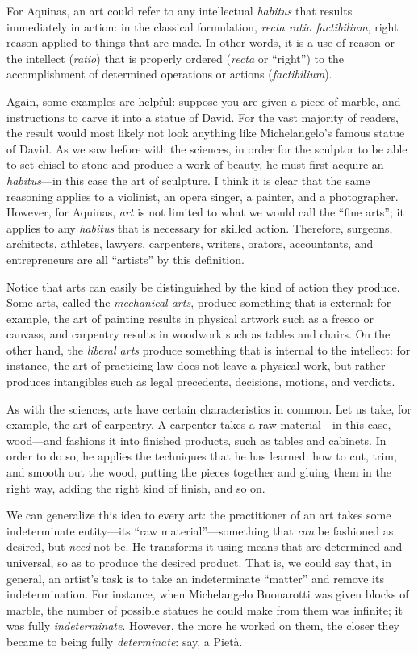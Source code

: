 \documentclass[
  12pt,
]{memoir}
\begin{document}
For Aquinas, an art could refer to any intellectual \emph{habitus} that
results immediately in action: in the classical formulation, \emph{recta
ratio factibilium}, right reason applied to things that are made. In
other words, it is a use of reason or the intellect (\emph{ratio}) that
is properly ordered (\emph{recta} or ``right'') to the accomplishment of
determined operations or actions (\emph{factibilium}).

Again, some examples are helpful: suppose you are given a piece of
marble, and instructions to carve it into a statue of David. For the
vast majority of readers, the result would most likely not look anything
like Michelangelo's famous statue of David. As we saw before with the
sciences, in order for the sculptor to be able to set chisel to stone
and produce a work of beauty, he must first acquire an
\emph{habitus}---in this case the art of sculpture. I think it is clear
that the same reasoning applies to a violinist, an opera singer, a
painter, and a photographer. However, for Aquinas, \emph{art} is not
limited to what we would call the ``fine arts''; it applies to any
\emph{habitus} that is necessary for skilled action. Therefore,
surgeons, architects, athletes, lawyers, carpenters, writers, orators,
accountants, and entrepreneurs are all ``artists'' by this definition.

Notice that arts can easily be distinguished by the kind of action they
produce. Some arts, called the \emph{mechanical arts}, produce something
that is external: for example, the art of painting results in physical
artwork such as a fresco or canvass, and carpentry results in woodwork
such as tables and chairs. On the other hand, the \emph{liberal arts}
produce something that is internal to the intellect: for instance, the
art of practicing law does not leave a physical work, but rather
produces intangibles such as legal precedents, decisions, motions, and
verdicts.

As with the sciences, arts have certain characteristics in common. Let
us take, for example, the art of carpentry. A carpenter takes a raw
material---in this case, wood---and fashions it into finished products,
such as tables and cabinets. In order to do so, he applies the
techniques that he has learned: how to cut, trim, and smooth out the
wood, putting the pieces together and gluing them in the right way,
adding the right kind of finish, and so on.

We can generalize this idea to every art: the practitioner of an art
takes some indeterminate entity---its ``raw material''---something that
\emph{can} be fashioned as desired, but \emph{need} not be. He
transforms it using means that are determined and universal, so as to
produce the desired product. That is, we could say that, in general, an
artist's task is to take an indeterminate ``matter'' and remove its
indetermination. For instance, when Michelangelo Buonarotti was given
blocks of marble, the number of possible statues he could make from them
was infinite; it was fully \emph{indeterminate}. However, the more he
worked on them, the closer they became to being fully
\emph{determinate}: say, a Pietà.
\end{document}
